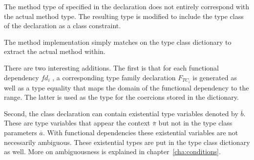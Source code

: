 The method type of specified in the declaration does not entirely correspond
with the actual method type. The resulting type is modified to include the type
class of the declaration as a class constraint.

The method implementation simply matches on the type class dictionary to extract
the actual method within.

There are two interesting additions. The first is that for each functional
dependency $fd_i$ , a corresponding type family declaration $F_{TC_i}$ is
generated as well as a type equality that maps the domain of the functional
dependency to the range. The latter is used as the type for the coercions stored
in the dictionary.

Second, the class declaration can contain existential type variables denoted by
$\overline{b}$. These are type variables that appear the context
$\overline{\pi}$ but not in the type class parameters $\overline{a}$. With
functional dependencies these existential variables are not necessarily
ambiguous. These existential types are put in the type class dictionary as well.
More on ambiguousness is explained in chapter~\ref{cha:conditions}.

